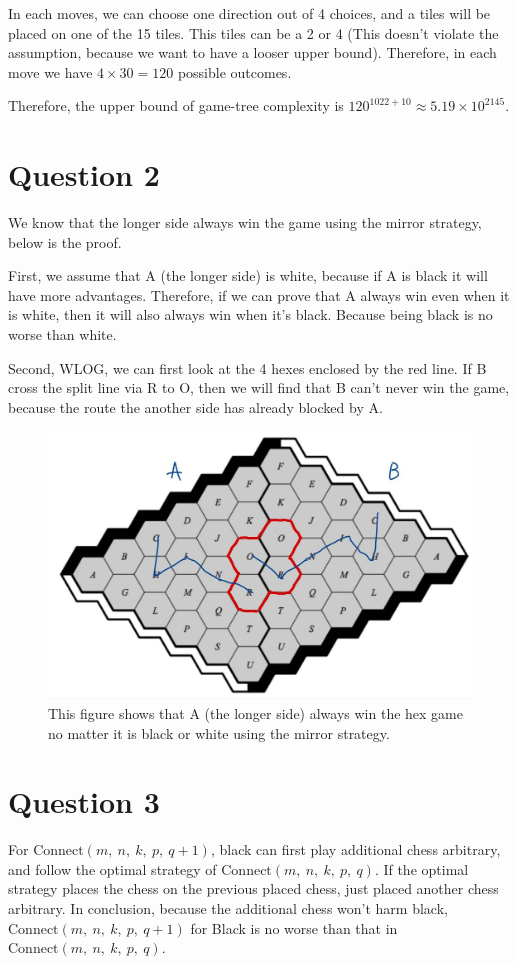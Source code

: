\documentclass{article}[12pt]
\begin{document}
In each moves, we can choose one direction out of 4 choices, and a tiles will be placed on one of the 15 tiles. This tiles can be a 2 or 4 (This doesn't violate the assumption, because we want to have a looser upper bound). Therefore, in each move we have $4 \times 30 = 120$ possible outcomes.

Therefore, the upper bound of game-tree complexity is $120^{1022+10} \approx 5.19 \times 10^{2145}$.

\section{Question 2}

We know that the longer side always win the game using the mirror strategy, below is the proof.

First, we assume that A (the longer side) is white, because if A is black it will have more advantages. Therefore, if we can prove that A always win even when it is white, then it will also always win when it's black. Because being black is no worse than white.

Second, WLOG, we can first look at the 4 hexes enclosed by the red line. If B cross the split line via R to O, then we will find that B can't never win the game, because the route the another side has already blocked by A. 

\begin{figure}[H]
	\centering
	\includegraphics[width=0.7\linewidth]{hex}
	\caption{This figure shows that A (the longer side) always win the hex game no matter it is black or white using the mirror strategy.}
	\label{fig:hex}
\end{figure}


\section{Question 3}

For $\text{Connect}(m,\ n,\ k,\ p,\ q+1)$, black can first play additional chess arbitrary, and follow the optimal strategy of $\text{Connect}(m,\ n,\ k,\ p,\ q)$. If the optimal strategy places the chess on the previous placed chess, just placed another chess arbitrary. In conclusion, because the additional chess won't harm black, $\text{Connect}(m,\ n,\ k,\ p,\ q+1)$ for Black is no worse than that in $\text{Connect}(m,\ n,\ k,\ p,\ q)$.
\end{document}

